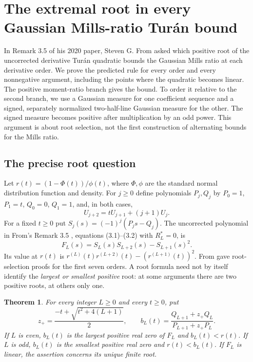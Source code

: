 \documentclass[11pt,a4paper]{article}
\numberwithin{equation}{section}
\newtheorem{theorem}{Theorem}[section]
\theoremstyle{definition}
\theoremstyle{remark}
\newenvironment{sectionabstract}{\par\smallskip\begingroup\small\noindent}{\par\endgroup\medskip}
\begin{document}
\par\endgroup

\begingroup

\section{\texorpdfstring{The extremal root in every Gaussian Mills-ratio Tur\'an bound}{The extremal root in every Gaussian Mills-ratio Tur\'an bound}}\label{section:r34showa}
\par\medskip

\begin{sectionabstract}
In Remark 3.5 of his 2020 paper, Steven G. From asked which positive root of the uncorrected derivative Tur\'an quadratic bounds the Gaussian Mills ratio at each derivative order. We prove the predicted rule for every order and every nonnegative argument, including the points where the quadratic becomes linear. The positive moment-ratio branch gives the bound. To order it relative to the second branch, we use a Gaussian measure for one coefficient sequence and a signed, separately normalized two-half-line Gaussian measure for the other. The signed measure becomes positive after multiplication by an odd power. This argument is about root selection, not the first construction of alternating bounds for the Mills ratio.
\end{sectionabstract}

\subsection{The precise root question}
Let $r(t)=(1-\Phi(t))/\phi(t)$, where $\Phi,\phi$ are the standard normal distribution function and density. For $j\ge0$ define polynomials $P_j,Q_j$ by $P_0=1$, $P_1=t$, $Q_0=0$, $Q_1=1$, and, in both cases,
\[
 U_{j+2}=tU_{j+1}+(j+1)U_j .
\]
For a fixed $t\ge0$ put $S_j(s)=(-1)^j(P_js-Q_j)$. The uncorrected polynomial in From's Remark 3.5 \cite{r34showa:from}, equations (3.1)--(3.2) with $R_L^*=0$, is
\[
 F_L(s)=S_L(s)S_{L+2}(s)-S_{L+1}(s)^2 .
\]
Its value at $r(t)$ is $r^{(L)}(t)r^{(L+2)}(t)-(r^{(L+1)}(t))^2$. From gave root-selection proofs for the first seven orders. A root formula need not by itself identify the \emph{largest or smallest positive} root: at some arguments there are two positive roots, at others only one.
\begin{theorem}
For every integer $L\ge0$ and every $t\ge0$, put
\[
 z_+=\frac{-t+\sqrt{t^2+4(L+1)}}2,\qquad
 b_L(t)=\frac{Q_{L+1}+z_+Q_L}{P_{L+1}+z_+P_L}.
\]
If $L$ is even, $b_L(t)$ is the largest positive real zero of $F_L$ and
$b_L(t)<r(t)$. If $L$ is odd, $b_L(t)$ is the smallest positive real zero
and $r(t)<b_L(t)$. If $F_L$ is linear, the assertion concerns its unique finite root.
\end{theorem}
\end{document}
